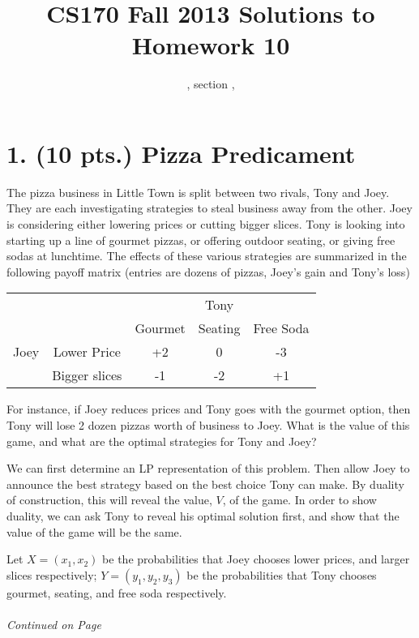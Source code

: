 \documentclass[11pt]{article}
\title{CS170  Fall 2013 Solutions to Homework 10}
\author{\Name, section \Sec, \texttt{\Login}}
\begin{document}
\maketitle

\section*{1. (10 pts.) Pizza Predicament}


The pizza business in Little Town is split between two rivals, Tony and Joey. 
They are each investigating strategies to steal business away from the other. 
Joey is considering either lowering prices or cutting bigger slices. Tony is 
looking into starting up a line of gourmet pizzas, or offering outdoor seating, 
or giving free sodas at lunchtime. The effects of these various strategies are 
summarized in the following payoff matrix (entries are dozens of pizzas, Joey's 
gain and Tony's loss)

\begin{tabular}{c c | c c c}
 &&&Tony&\\
 &&Gourmet & Seating & Free Soda \\
\hline
 Joey & Lower Price & +2 & 0 & -3\\
 & Bigger slices & -1 & -2 & +1
\end{tabular}

For instance, if Joey reduces prices and Tony goes with the gourmet option, 
then Tony will lose 2 dozen pizzas worth of business to Joey.
What is the value of this game, and what are the optimal strategies for Tony 
and Joey?

We can first determine an LP representation
of this problem. Then allow Joey to announce the best strategy based on the 
best choice Tony can make. By duality of construction, this will reveal the
value, $V$, of the game. In order to show duality, we can ask Tony to reveal
his optimal solution first, and show that the value of the game will be the 
same.

Let $X=(x_1,x_2)$ be the probabilities that Joey chooses lower prices, and 
larger slices respectively; 
$Y=(y_1,y_2,y_3)$ be the probabilities that Tony chooses gourmet, seating, 
and free soda respectively. 


\label{pg:end-of-p1}
%
 \paragraph{} \emph{Continued on Page \pageref{pg:p1-continuation}}
\end{document}
